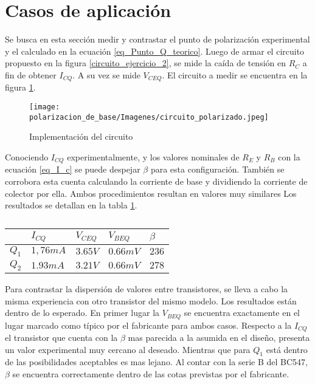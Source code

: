\section{Casos de aplicación}

Se busca en esta sección medir y contrastar 
el punto de polarización experimental y el calculado en la ecuación 
\ref{eq_Punto_Q_teorico}.
Luego de armar el circuito propuesto 
en la figura \ref{circuito_ejercicio_2}, se mide la caída de tensión en $R_C$ a fin de obtener $I_{CQ}$. A su vez se mide $V_{CEQ}$. El circuito a medir se encuentra en la figura \ref{fig_circuito_fisico}.

\begin{figure}[H]
    \centering
    \texttt{[image: polarizacion\_de\_base/Imagenes/circuito\_polarizado.jpeg]}
    \caption{Implementación del circuito}\label{fig_circuito_fisico}
\end{figure} 


Conociendo $I_{CQ}$ experimentalmente, y los valores nominales de $R_E$ y $R_B$ con la ecuación \ref{eq_I_c} se puede despejar $\beta$ para esta configuración. También se corrobora esta cuenta calculando la corriente de base y dividiendo la corriente de colector por ella.
Ambos procedimientos resultan en valores muy similares
Los resultados se detallan en la tabla \ref{tabla_resultados_polarizacion}.

\begin{table}[ht]
    \centering
    \begin{tabular}{|l|l|l|l|l|}
    \hline
          & $I_{CQ}$  & $V_{CEQ}$ & $V_{BEQ}$ & $\beta$ \\ \hline
    $Q_1$ & $1,76 mA$ & $3.65 V$ & $0.66 mV$  & $236$   \\ \hline
    $Q_2$ & $1.93 mA$ & $3.21 V$  & $0.66 mV$ & $278$   \\ \hline
    \end{tabular}
    \caption{}\label{tabla_resultados_polarizacion}
\end{table}
Para contrastar la dispersión de valores entre transistores, se lleva a cabo la misma experiencia con otro transistor del mismo modelo.
Los resultados están dentro de lo esperado. En primer lugar la $V_{BEQ}$ se encuentra exactamente en el lugar marcado como típico por el fabricante para ambos casos.
Respecto a la $I_{CQ}$ el transistor que cuenta con la $\beta$ mas parecida a la asumida en el diseño, presenta un valor experimental muy cercano al deseado. Mientras que para $Q_1$ está dentro de las posibilidades aceptables es mas lejano. 
Al contar con la serie B del BC547, $\beta$ se encuentra correctamente dentro de las cotas previstas por el fabricante.

